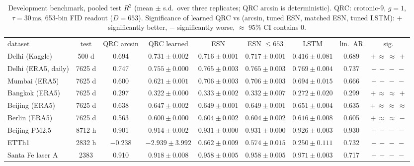 \documentclass[aps,prresearch,preprint,superscriptaddress,amsmath,amssymb,floatfix]{revtex4-2}
\newcommand{\SI}[2]{\ensuremath{#1\,\mathrm{#2}}}
\begin{document}
\begin{table}[t]
\caption{\label{tab:bench}Development benchmark, pooled test $R^2$ (mean $\pm$ s.d.\ over
three replicates; QRC arcsin is deterministic). QRC: crotonic-9, $g=1$, $\tau=\SI{30}{ms}$,
653-bin FID readout ($D=653$). Significance of learned QRC vs (arcsin, tuned ESN,
matched ESN, tuned LSTM): $+$ significantly better, $-$ significantly worse, $\approx$
95\% CI contains 0.}
\scriptsize\setlength{\tabcolsep}{2pt}
\begin{ruledtabular}
\begin{tabular}{lcccccccc}
dataset & test & QRC arcsin & QRC learned & ESN & ESN $\le653$ & LSTM & lin.\ AR & sig. \\ \colrule
Delhi (Kaggle) & 500 d & 0.694 & $\mathbf{0.731\pm0.002}$ & $0.716\pm0.001$ & $0.717\pm0.001$ & $0.416\pm0.081$ & 0.689 & $+\,\approx\,\approx\,+$ \\
Delhi (ERA5, daily) & 7625 d & 0.747 & $0.755\pm0.000$ & $0.765\pm0.003$ & $0.765\pm0.003$ & $\mathbf{0.769\pm0.004}$ & 0.737 & $+\,-\,-\,-$ \\
Mumbai (ERA5) & 7625 d & 0.600 & $0.621\pm0.001$ & $\mathbf{0.706\pm0.003}$ & $0.706\pm0.003$ & $0.694\pm0.015$ & 0.666 & $+\,-\,-\,-$ \\
Bangkok (ERA5) & 7625 d & 0.297 & $0.322\pm0.000$ & $\mathbf{0.333\pm0.002}$ & $0.332\pm0.007$ & $0.272\pm0.020$ & 0.299 & $+\,\approx\,\approx\,+$ \\
Beijing (ERA5) & 7625 d & 0.638 & $0.647\pm0.002$ & $0.649\pm0.001$ & $0.649\pm0.001$ & $\mathbf{0.651\pm0.004}$ & 0.635 & $+\,\approx\,\approx\,\approx$ \\
Berlin (ERA5) & 7625 d & 0.563 & $0.600\pm0.000$ & $0.604\pm0.002$ & $0.604\pm0.002$ & $\mathbf{0.616\pm0.008}$ & 0.605 & $+\,\approx\,\approx\,-$ \\
Beijing PM2.5 & 8712 h & 0.901 & $0.914\pm0.002$ & $0.931\pm0.000$ & $\mathbf{0.931\pm0.000}$ & $0.926\pm0.003$ & 0.930 & $+\,-\,-\,-$ \\
ETTh1 & 2832 h & $-0.238$ & $-2.939\pm3.992$ & $0.662\pm0.009$ & $0.574\pm0.015$ & $0.250\pm0.111$ & $\mathbf{0.732}$ & $-\,-\,-\,-$ \\
Santa Fe laser A & 2383 & 0.910 & $0.918\pm0.008$ & $0.958\pm0.005$ & $0.958\pm0.005$ & $\mathbf{0.971\pm0.003}$ & 0.717 & $+\,-\,-\,-$ \\
\end{tabular}
\end{ruledtabular}
\end{table}
\end{document}
